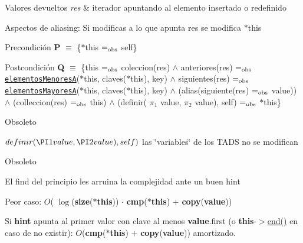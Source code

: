 \begin{DoxyRetVals}{Valores devueltos}
{\em res} & iterador apuntando al elemento insertado o redefinido\\
\hline
\end{DoxyRetVals}
\begin{DoxyParagraph}{Aspectos de aliasing\+:}
Si modificas a lo que apunta res se modifica $\ast$this
\end{DoxyParagraph}
\begin{DoxyPrecond}{Precondición}
{\bfseries P} $\equiv$ \{$\ast$this $=_{\rm obs}$ self\} 
\end{DoxyPrecond}
\begin{DoxyPostcond}{Postcondición}
{\bfseries Q} $\equiv$ \{this $=_{\rm obs}$ coleccion(res) $\land$ anteriores(res) $=_{\rm obs}$ \href{axiomas.html#elementosMenoresA}{\tt elementos\+MenoresA}($\ast$this, claves($\ast$this), key) $\land$ siguientes(res) $=_{\rm obs}$ \href{axiomas.html#elementosMayoresA}{\tt elementos\+MayoresA}($\ast$this, claves($\ast$this), key) $\land$ (alias(siguiente(res) $=_{\rm obs}$ value)) $\land$ (colleccion(res) $=_{\rm obs}$ this) $\land$ (definir( $\pi_1$ value, $\pi_2$ value), self) $=_{\rm obs}$ $\ast$this\}
\end{DoxyPostcond}
\begin{DoxyRefDesc}{Obsoleto}
\item[\hyperlink{deprecated__deprecated000014}{Obsoleto}]$ definir(\PI1 value, \PI2 value), self) $ las \char`\"{}variables\char`\"{} de los T\+A\+DS no se modifican\end{DoxyRefDesc}


\begin{DoxyRefDesc}{Obsoleto}
\item[\hyperlink{deprecated__deprecated000015}{Obsoleto}]El find del principio les arruina la complejidad ante un buen hint\end{DoxyRefDesc}



\begin{DoxyDescription}
\item[Complejidad Temporal]
\begin{DoxyItemize}
\item Peor caso\+: $O$( $\log$({\bfseries size}({\bfseries $\ast$this})) $\cdot$ {\bfseries cmp}({\bfseries $\ast$this}) $+$ {\bfseries copy}({\bfseries value}))
\item Si {\bfseries hint} apunta al primer valor con clave al menos {\bfseries value}.first (o {\bfseries this}-\/$>$\hyperlink{classaed2_1_1map_a76023e6a56cb625513e1b5ea028bf983_a76023e6a56cb625513e1b5ea028bf983}{end()} en caso de no existir)\+: $O$({\bfseries cmp}({\bfseries $\ast$this}) $+$ {\bfseries copy}({\bfseries value})) amortizado. 
\end{DoxyItemize}
\end{DoxyDescription}

